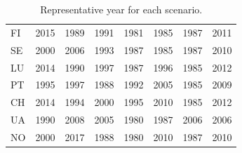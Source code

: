 \documentclass[12pt]{article}
\begin{document}
\begin{table}[h!]
\begin{tabular}{l|lllllll}
FI & 2015    & 1989 & 1991   & 1981 & 1985    & 1987   & 2011   \\
SE & 2000    & 2006 & 1993   & 1987 & 1985    & 1987   & 2010   \\
LU & 2014    & 1990 & 1997   & 1987 & 1996    & 1985   & 2012   \\
PT & 1995    & 1997 & 1988   & 1992 & 2005    & 1985   & 2009   \\
CH & 2014    & 1994 & 2000   & 1995 & 2010    & 1985   & 2012   \\
UA & 1990    & 2008 & 2005   & 1980 & 1987    & 2006   & 2006   \\
NO & 2000    & 2017 & 1988   & 1980 & 2010    & 1987   & 2010  
\end{tabular}
\caption{Representative year for each scenario.} \label{table:rep_year}
\end{table}
\end{document}
